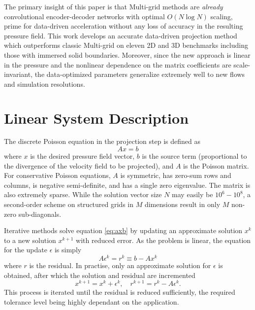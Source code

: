\documentclass[review]{elsarticle}
\begin{document}
The primary insight of this paper is that Multi-grid methods are \textit{already} convolutional encoder-decoder networks with optimal $O(N\log N)$ scaling, prime for data-driven acceleration without any loss of accuracy in the resulting pressure field. This work develops an accurate data-driven projection method which outperforms classic Multi-grid on eleven 2D and 3D benchmarks including those with immersed solid boundaries. Moreover, since the new approach is linear in the pressure and the nonlinear dependence on the matrix coefficients are scale-invariant, the data-optimized parameters generalize extremely well to new flows and simulation resolutions.

\section{Linear System Description}

The discrete Poisson equation in the projection step is defined as
\begin{equation}\label{eq:axb}
    A x = b
\end{equation}
where $x$ is the desired pressure field vector, $b$ is the source term (proportional to the divergence of the velocity field to be projected), and $A$ is the Poisson matrix. For conservative Poisson equations, $A$ is symmetric, has zero-sum rows and columns, is negative semi-definite, and has a single zero eigenvalue. The matrix is also extremely sparse. While the solution vector size $N$ may easily be $10^6-10^8$, a second-order scheme on structured grids in $M$ dimensions result in only $M$ non-zero sub-diagonals.

Iterative methods solve equation \ref{eq:axb} by updating an approximate solution $x^k$ to a new solution $x^{k+1}$ with reduced error. As the problem is linear, the equation for the update $\epsilon$ is simply
\begin{equation}\label{eq:aer} 
    A \epsilon^k = r^k \equiv b - Ax^k
\end{equation}
where $r$ is the residual. In practise, only an approximate solution for $\epsilon$ is obtained, after which the solution and residual are incremented
\begin{equation}\label{eq:increment}
    x^{k+1} = x^k+\epsilon^k, \quad r^{k+1} = r^k-A\epsilon^k.
\end{equation}
This process is iterated until the residual is reduced sufficiently, the required tolerance level being highly dependant on the application.
\end{document}
